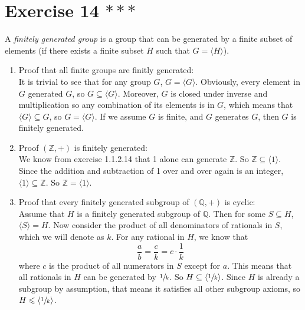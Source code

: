 \documentclass[12pt]{article}
\newcommand{\Z}{\mathbb{Z}}
\newcommand{\Q}{\mathbb{Q}}
\newcommand{\seq}{\leqslant}
\newcommand{\sub}{\subseteq}
\begin{document}
    \section*{Exercise 14 $***$}
    A \textit{finitely generated group} is a group that can be generated
    by a finite subset of elements
    (if there exists a finite subset $H$ such that $G = \langle H \rangle$).
    \begin{enumerate}[label=\textbf{\alph*.}]
        \item 
            Proof that all finite groups are finitly generated: \\
            It is trivial to see that for any group $G$,
            $G = \langle G \rangle$.
            Obviously, every element in $G$ generated $G$,
            so $G \sub \langle G \rangle$.
            Moreover, $G$ is closed under inverse and multiplication
            so any combination of its elements is in $G$,
            which means that $\langle G \rangle \sub G$,
            so $G = \langle G \rangle$.
            If we assume $G$ is finite,
            and $G$ generates $G$,
            then $G$ is finitely generated.
        \item 
            Proof $(\Z, +)$ is finitely generated: \\
            We know from exercise 1.1.2.14 that 1 alone can generate $\Z$.
            So $\Z \sub \langle 1 \rangle$.
            Since the addition and subtraction of 1 over and over again
            is an integer,
            $\langle 1 \rangle \sub \Z$.
            So $\Z = \langle 1 \rangle$.
        \item
            Proof that every finitely generated subgroup of $(\Q, +)$
            is cyclic: \\
            Assume that $H$ is a finitely generated subgroup of $\Q$.
            Then for some $S \sub H$,
            $\langle S \rangle = H$.
            Now consider the product of all denominators of rationals in $S$,
            which we will denote as $k$.
            For any rational in $H$,
            we know that 
            \[ \dfrac{a}{b} = \dfrac{c}{k} = c \cdot \dfrac{1}{k} \]
            where $c$ is the product of all numerators in $S$
            except for $a$.
            This means that all rationals in $H$
            can be generated by $\sfrac{1}{k}$.
            So $H \sub \langle \sfrac{1}{k} \rangle$.
            Since $H$ is already a subgroup by assumption,
            that means it satisfies all other subgroup axioms,
            so $H \seq \langle \sfrac{1}{k} \rangle$.

\end{enumerate}
\end{document}
